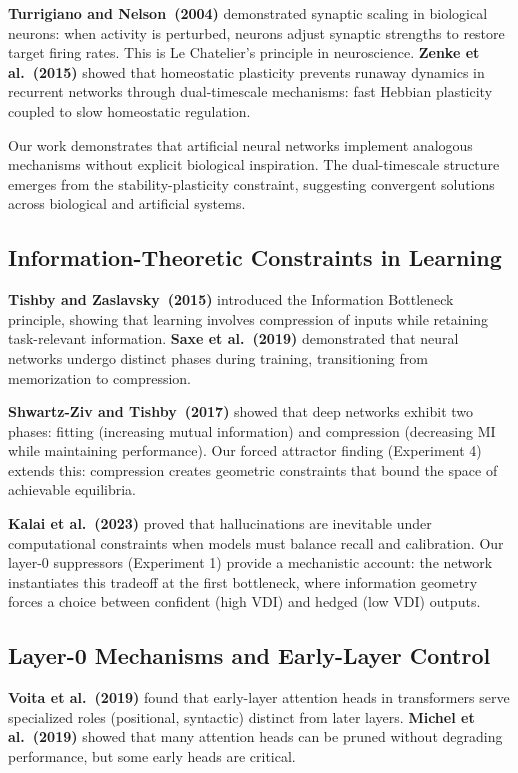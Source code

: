 \textbf{Turrigiano and Nelson~(2004)} demonstrated synaptic scaling in biological neurons: when activity is perturbed, neurons adjust synaptic strengths to restore target firing rates. This is Le Chatelier's principle in neuroscience. \textbf{Zenke et al.~(2015)} showed that homeostatic plasticity prevents runaway dynamics in recurrent networks through dual-timescale mechanisms: fast Hebbian plasticity coupled to slow homeostatic regulation.

Our work demonstrates that artificial neural networks implement analogous mechanisms without explicit biological inspiration. The dual-timescale structure emerges from the stability-plasticity constraint, suggesting convergent solutions across biological and artificial systems.

\subsection{Information-Theoretic Constraints in Learning}

\textbf{Tishby and Zaslavsky~(2015)} introduced the Information Bottleneck principle, showing that learning involves compression of inputs while retaining task-relevant information. \textbf{Saxe et al.~(2019)} demonstrated that neural networks undergo distinct phases during training, transitioning from memorization to compression.

\textbf{Shwartz-Ziv and Tishby~(2017)} showed that deep networks exhibit two phases: fitting (increasing mutual information) and compression (decreasing MI while maintaining performance). Our forced attractor finding (Experiment 4) extends this: compression creates geometric constraints that bound the space of achievable equilibria.

\textbf{Kalai et al.~(2023)} proved that hallucinations are inevitable under computational constraints when models must balance recall and calibration. Our layer-0 suppressors (Experiment 1) provide a mechanistic account: the network instantiates this tradeoff at the first bottleneck, where information geometry forces a choice between confident (high VDI) and hedged (low VDI) outputs.

\subsection{Layer-0 Mechanisms and Early-Layer Control}

\textbf{Voita et al.~(2019)} found that early-layer attention heads in transformers serve specialized roles (positional, syntactic) distinct from later layers. \textbf{Michel et al.~(2019)} showed that many attention heads can be pruned without degrading performance, but some early heads are critical.


